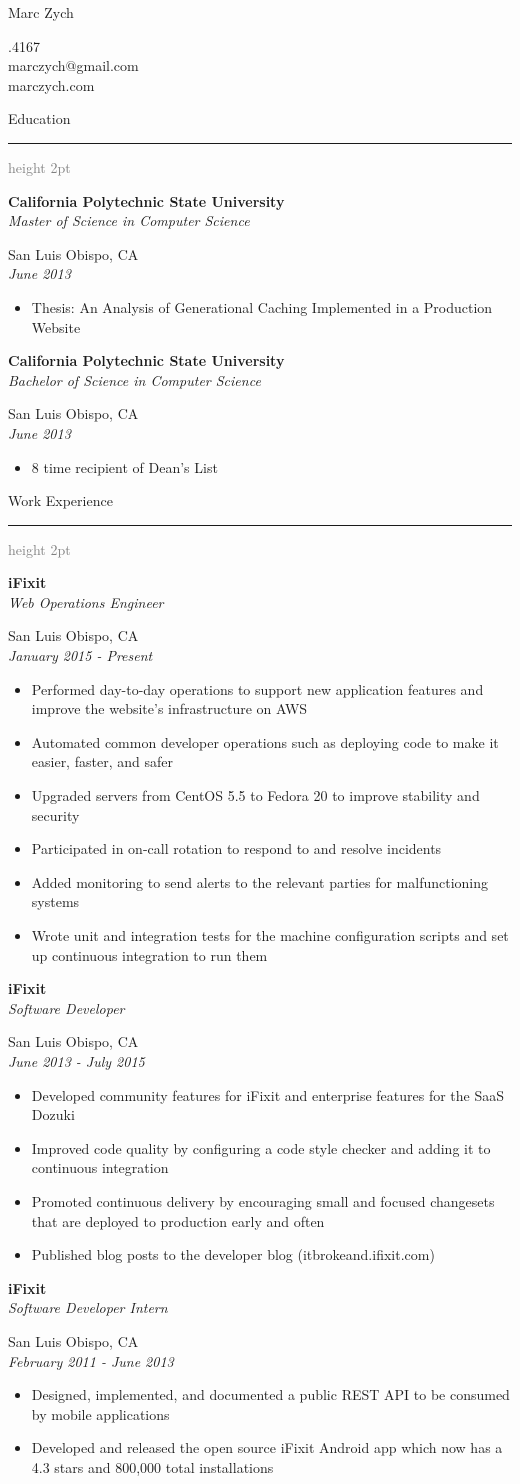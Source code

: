 \documentclass[letterpaper,11pt]{article}
\newcommand{\resauthor}[4]{
   \begin{minipage}[c]{.4\textwidth}
      \raggedright
      {\Huge #1}
   \end{minipage}
   \hfill
   \begin{minipage}[c]{.4\textwidth}
      \raggedleft
      #2\\
      #3\\
      #4
   \end{minipage}
}
\newcommand{\ressectiondivider}{
   \vspace{5pt}
   \textcolor{gray}{\hrule height 2pt}
}
\newcommand{\resitem}[1]{\item #1 \vspace{-2pt}}
\newcommand{\resheading}[1]{
   \vspace{4pt}
   {\Large #1}
   \ressectiondivider
   \vspace{10pt}
}
\newcommand{\ressubheading}[4]{
   \begin{minipage}[t]{7cm}
      \flushleft
      \textbf{#1}\\
      \textit{#3}\\
   \end{minipage}
   \hfill
   \begin{minipage}[t]{7cm}
      \flushright
      #2\\
      \textit{#4}\\
   \end{minipage}
}
\begin{document}
\resauthor{Marc Zych}{805.217.4167}{marczych@gmail.com}{marczych.com}

\vspace{20pt}

\resheading{Education}
\ressubheading{California Polytechnic State University}{San Luis Obispo, CA}{Master of Science in Computer Science}{June 2013}
\begin{itemize}
   \resitem{Thesis: An Analysis of Generational Caching Implemented in a Production Website}
\end{itemize}
\ressubheading{California Polytechnic State University}{San Luis Obispo, CA}{Bachelor of Science in Computer Science}{June 2013}
\begin{itemize}
   \resitem{8 time recipient of Dean's List}
\end{itemize}

\resheading{Work Experience}
\ressubheading{iFixit}{San Luis Obispo, CA}{Web Operations Engineer}{January 2015 - Present}
\begin{itemize}
   \resitem{Performed day-to-day operations to support new application features and improve the website's infrastructure on AWS}
   \resitem{Automated common developer operations such as deploying code to make it easier, faster, and safer}
   \resitem{Upgraded servers from CentOS 5.5 to Fedora 20 to improve stability and security}
   \resitem{Participated in on-call rotation to respond to and resolve incidents}
   \resitem{Added monitoring to send alerts to the relevant parties for malfunctioning systems}
   \resitem{Wrote unit and integration tests for the machine configuration scripts and set up continuous integration to run them}
\end{itemize}
\ressubheading{iFixit}{San Luis Obispo, CA}{Software Developer}{June 2013 - July 2015}
\begin{itemize}
   \resitem{Developed community features for iFixit and enterprise features for the SaaS Dozuki}
   \resitem{Improved code quality by configuring a code style checker and adding it to continuous integration}
   \resitem{Promoted continuous delivery by encouraging small and focused changesets that are deployed to production early and often}
   \resitem{Published blog posts to the developer blog (itbrokeand.ifixit.com)}
\end{itemize}
\ressubheading{iFixit}{San Luis Obispo, CA}{Software Developer Intern}{February 2011 - June 2013}
\begin{itemize}
   \resitem{Designed, implemented, and documented a public REST API to be consumed by mobile applications}
   \resitem{Developed and released the open source iFixit Android app which now has a 4.3 stars and 800,000 total installations}
\end{itemize}
\end{document}
